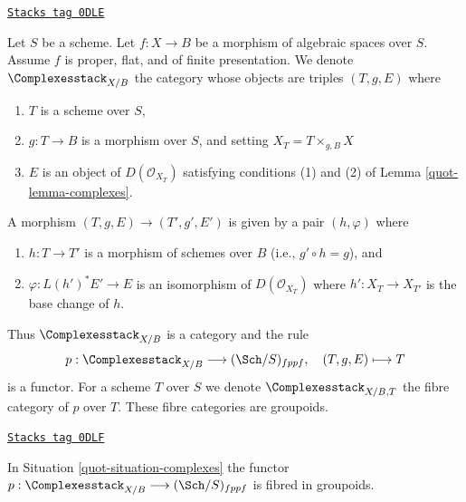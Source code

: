\begin{definition}
\label{quot-situation-complexes}
\href{https://stacks.math.columbia.edu/tag/0DLE}{\texttt{Stacks tag 0DLE}}

Let $S$ be a scheme. Let $f : X \to B$ be a morphism of algebraic spaces
over $S$. Assume $f$ is proper, flat, and of finite presentation.
We denote $\Complexesstack_{X/B}$ the category whose objects are
triples $(T, g, E)$ where
\begin{enumerate}
\item $T$ is a scheme over $S$,
\item $g : T \to B$ is a morphism over $S$, and setting
$X_T = T \times_{g, B} X$
\item $E$ is an object of $D(\mathcal{O}_{X_T})$ satisfying
conditions (1) and (2) of Lemma \ref{quot-lemma-complexes}.
\end{enumerate}
A morphism $(T, g, E) \to (T', g', E')$
is given by a pair $(h, \varphi)$ where
\begin{enumerate}
\item $h : T \to T'$ is a morphism of schemes over $B$
(i.e., $g' \circ h = g$), and
\item $\varphi : L(h')^*E' \to E$ is an
isomorphism of $D(\mathcal{O}_{X_T})$ where $h' : X_T \to X_{T'}$
is the base change of $h$.
\end{enumerate}
\end{definition}

Thus $\Complexesstack_{X/B}$ is a category and the rule
$$
p : \Complexesstack_{X/B} \longrightarrow (\Sch/S)_{fppf},
\quad
(T, g, E) \longmapsto T
$$
is a functor. For a scheme $T$ over $S$ we denote $\Complexesstack_{X/B, T}$
the fibre category of $p$ over $T$. These fibre categories are groupoids.

\begin{lemma}
\label{quot-lemma-complexes-fibred-in-groupoids}
\href{https://stacks.math.columbia.edu/tag/0DLF}{\texttt{Stacks tag 0DLF}}

In Situation \ref{quot-situation-complexes} the functor
$p : \Complexesstack_{X/B} \longrightarrow (\Sch/S)_{fppf}$
is fibred in groupoids.
\end{lemma}

